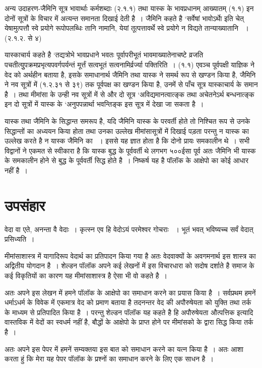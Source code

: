 {अन्य उदाहरण-जैमिनि सूत्र भावार्थाः कर्मशब्दाः (२.१.१) तथा यास्क के भावप्रधानम् आख्यातम् (१.१) इन दोनों सूत्रों के विचार में अत्यन्त समानता दिखाई देती है~। जैमिनि कहते है ‘सर्वेषां भावोऽर्थाे इति चेत् येषामुत्पत्तौ स्वे प्रयोगे रूपोपलब्धिः तानि नामानि, येयां तूत्पत्तावर्थे स्वे  प्रयोगे न विद्यते तान्याख्यातानि ~। (२.१.२. से ४)   

यास्काचार्य कहते है ‘तद्यत्रोभे भावप्रधाने भवतः पूर्वापरीभूतं भावमाख्यातेनाचष्टे व्रजति पचतीत्युुपक्रमप्रभृत्यपवर्गपर्यन्तं मूर्त्तं सत्वभूतं सत्वनामिर्व्रर्ज्या पक्तिरिति~। (१.१)  एवञ्च पूर्वपक्षी याज्ञिक ने वेद को अर्थहीन बताया है, इसके समाधानार्थ जैमिनि तथा यास्क ने समर्थ रूप से खण्डन किया है, जैमिनि ने नव सूत्रों में (१.२.३१ से ३९) तक पूर्वपक्ष का खण्डन किया है, उनमें से पाँच सूत्र यास्काचार्य के समान है~। तथा मीमांसा के उन्ही नव सूत्रों में से और दो सूत्र ‘अविद्यमानत्वात्ङ्क तथा अचेतनेऽर्थ बन्धनात्ङ्क इन दो सूत्रों में यास्क के ‘अनुपपन्नार्था भवन्तिङ्क इस सूत्र में देखा जा सकता है~। 

यास्क तथा जैमिनि के सिद्धान्त समरूप है, यदि जैमिनि यास्क के परवर्ती होते तो निश्चित रूप से उनके सिद्धान्तों का अध्ययन किया होता तथा उनका उल्लेख मीमांसासूत्रों में दिखाई पड़ता परन्तु न यास्क का उल्लेख करते है न यास्क जैमिनि का ~। इससे यह ज्ञात होता है कि दोनो प्रायः समकालीन थे~। सभी विद्वानों ने एकमत से स्वीकारा है कि यास्क बुद्ध के पूर्ववर्ती थे लगभग ५००ईसा पूर्व अतः जैमिनि भी यास्क के समकालीन होने से बुद्ध के पूर्ववर्ती सिद्ध होते है~। निष्कर्ष यह है पॉलॉक के आक्षेपो का कोई आधार नहीं है~। 

\section*{उपसंहार} 

	वेदा वा एते, अनन्ता वै वेदाः~।
	कृत्स्न एव हि वेदोऽयं परमेश्वर गोचराः ~।
	भूतं भवत् भविष्यच्च सर्वं वेदात् प्रसिध्यति~।

मीमांसाशास्त्र में यागादिरूप वेदार्थ का प्रतिपादन किया गया है अतः वेदवाक्यों के अवगमनार्थ इस शास्त्र का अद्वितीय योगदान है~। शेल्डन पॉलॉक अपने कई लेखनों में इस विचारधारा को सदोष दर्शाते है समाज के कई विकृतियों का कारण यह मीमांसाशास्त्र है ऐसा भी वो कहते है~।

अतः अपने इस लेखन में हमने पॉलॉक के आक्षेपो का समाधान करने का प्रयास किया है~। सर्वप्रथम हमनें धर्माऽधर्म के विवेक में एकमात्र वेद को प्रमाण बताया है तदनन्तर वेद की अपौरुषेयता को युक्ति तथा तर्क के माध्यम से प्रतिपादित किया है~। परन्तु शेल्डन पॉलॉक यह कहते है हि अपौरुषेयता औत्पत्तिक इत्यादि वास्तविक में वेदों का स्वधर्म नहीं है, बौद्धों के आक्षेपो के प्राप्त होने पर मीमांसको के द्वारा सिद्ध किया तर्क है~। 

अतः अपने इस पेपर में हमनें सम्यक्तया इस बात को समाधान करने का यत्न किया है~। अतः आशा करता हुं कि मेरा यह पेपर पॉलॉक के प्रश्नों का समाधान करने के लिए एक साधन है~।
}

